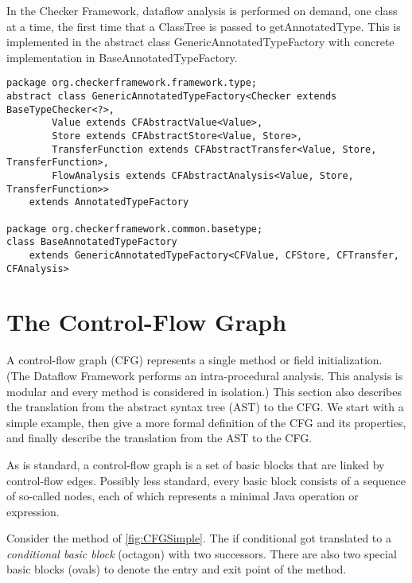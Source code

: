 In the Checker Framework, dataflow analysis is performed on demand,
one class at a time, the first time that a ClassTree is passed to
getAnnotatedType.  This is implemented in the abstract class
GenericAnnotatedTypeFactory with concrete implementation in
BaseAnnotatedTypeFactory.

\begin{verbatim}
package org.checkerframework.framework.type;
abstract class GenericAnnotatedTypeFactory<Checker extends BaseTypeChecker<?>,
        Value extends CFAbstractValue<Value>,
        Store extends CFAbstractStore<Value, Store>,
        TransferFunction extends CFAbstractTransfer<Value, Store, TransferFunction>,
        FlowAnalysis extends CFAbstractAnalysis<Value, Store, TransferFunction>>
    extends AnnotatedTypeFactory

package org.checkerframework.common.basetype;
class BaseAnnotatedTypeFactory
    extends GenericAnnotatedTypeFactory<CFValue, CFStore, CFTransfer, CFAnalysis>
\end{verbatim}


\section{The Control-Flow Graph}
\label{sec:cfg}

A control-flow graph (CFG) represents a single method or field
initialization.  (The Dataflow Framework performs an intra-procedural
analysis.  This analysis is modular and every method is considered in
isolation.)
This section also describes the translation from the abstract syntax tree
(AST) to the CFG\@.
We start with a simple example, then give a more formal
definition of the CFG and its properties, and finally describe the
translation from the AST to the CFG.

As is standard, a control-flow graph is a set of
basic blocks that are linked by control-flow edges. Possibly less
standard, every basic block consists of a sequence of so-called nodes,
each of which represents a minimal Java operation or expression.



Consider the method  of \autoref{fig:CFGSimple}. The if
conditional got translated to a \emph{conditional basic block}
(octagon) with two successors. There are also two special basic blocks
(ovals) to denote the entry and exit point of the method.


